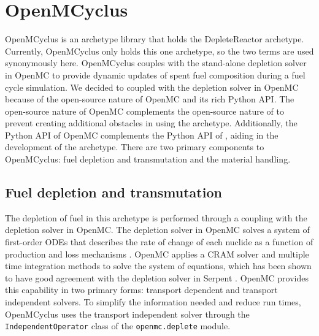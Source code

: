 \section{OpenMCyclus}\label{sec:openmcyclus}
OpenMCyclus is an archetype library that holds the DepleteReactor 
archetype. Currently, OpenMCyclus only holds this one archetype, so 
the two terms are used synonymously here. OpenMCyclus couples 
\Cyclus with the stand-alone depletion solver in OpenMC 
\cite{romano_depletion_2021} to provide 
dynamic updates of spent fuel composition during a fuel cycle simulation.
We decided to coupled with the depletion solver in OpenMC because 
of the open-source nature of OpenMC and its rich Python \gls{API}. 
The open-source nature of OpenMC complements the open-source nature 
of \Cyclus to prevent creating additional obstacles in using the archetype. 
Additionally, the Python \gls{API} of OpenMC complements the Python 
\gls{API} of \Cyclus, aiding in the development of the archetype. 
There are two primary components to OpenMCyclus: fuel depletion and 
transmutation and the material handling. 

\subsection{Fuel depletion and transmutation} \label{sec:transmute}
The depletion of fuel in this archetype is performed through a coupling with 
the depletion solver in OpenMC. The depletion solver in OpenMC solves a system 
of first-order ODEs that describes 
the rate of change of each nuclide as a function of production and loss 
mechanisms \cite{romano_depletion_2021}. OpenMC applies a \gls{CRAM} solver 
and multiple time integration methods to solve the system of equations, which 
has been shown to have good agreement with the depletion solver in Serpent 
\cite{romano_depletion_2021}. OpenMC provides this capability in two primary 
forms: transport dependent and transport independent solvers. To simplify 
the information needed and reduce run times, OpenMCyclus uses the transport 
independent solver through the \texttt{IndependentOperator} class of the 
\texttt{openmc.deplete} module. 

